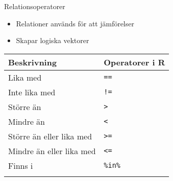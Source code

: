 \documentclass[
  10pt,
  ignorenonframetext,
]{beamer}
\providecommand{\tightlist}{%
  \setlength{\itemsep}{0pt}\setlength{\parskip}{0pt}}
\begin{document}
\begin{frame}{Relationsoperatorer}
\protect\hypertarget{relationsoperatorer}{}
\begin{itemize}
\tightlist
\item
  Relationer används för att jämförelser
\item
  Skapar logiska vektorer
\end{itemize}

\begin{longtable}[]{@{}ll@{}}
\toprule\noalign{}
Beskrivning & Operatorer i R \\
\midrule\noalign{}
\endhead
Lika med & \texttt{==} \\
Inte lika med & \texttt{!=} \\
Större än & \texttt{>} \\
Mindre än & \texttt{<} \\
Större än eller lika med & \texttt{>=} \\
Mindre än eller lika med & \texttt{<=} \\
Finns i & \texttt{\%in\%} \\
\bottomrule\noalign{}
\end{longtable}
\end{frame}
\end{document}
